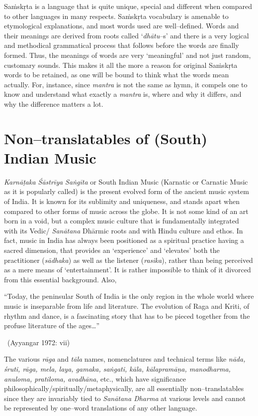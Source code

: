 Saṁskṛta is a language that is quite unique, special and different when compared to other languages in many respects. Saṁskṛta vocabulary is amenable to etymological explanations, and most words used are well–defined. Words and their meanings are derived from roots called ‘\textit{dhātu}–s’ and there is a very logical and methodical grammatical process that follows before the words are finally formed. Thus, the meanings of words are very ‘meaningful’ and not just random, customary sounds. This makes it all the more a reason for original Saṁskṛta words to be retained, as one will be bound to think what the words mean actually. For, instance, since \textit{mantra} is not the same as hymn, it compels one to know and understand what exactly a \textit{mantra} is\supskpt{\ref{999–aside.xhtmlid–c2–en3}}, where and why it differs, and why the difference matters a lot.


\section*{Non–translatables of (South) Indian Music}

\textit{Karnāṭaka Śāstrīya Saṅgīta} or South Indian Music (Karnatic or Carnatic Music as it is popularly called) is the present evolved form of the ancient music system of India. It is known for its sublimity and uniqueness, and stands apart when compared to other forms of music across the globe. It is not some kind of an art born in a void, but a complex music culture that is fundamentally integrated with its Vedic/ \textit{Sanātana} Dhārmic roots and with Hindu culture and ethos. In fact, music in India has always been positioned as a spiritual practice having a sacred dimension, that provides an ‘experience’ and ‘elevates’ both the practitioner (\textit{sādhaka}) as well as the listener (\textit{rasika}), rather than being perceived as a mere means of ‘entertainment’. It is rather impossible to think of it divorced from this essential background. Also,

\begin{myquote}
“Today, the peninsular South of India is the only region in the whole world where music is inseparable from life and literature. The evolution of Raga and Kriti, of rhythm and dance, is a fascinating story that has to be pieced together from the profuse literature of the ages…” 

~\hfill (Ayyangar 1972: vii)
\end{myquote}

The various \textit{rāga} and \textit{tāla} names, nomenclatures and technical terms like \textit{nāda, śruti, rāga, mela, laya, gamaka, saṅgati, kāla, kālapramāṇa, manodharma, anuloma, pratiloma, avadhāna}, etc., which have significance philosophically/spiritually/metaphysically, are all essentially non–translatables since they are invariably tied to \textit{Sanātana Dharma} at various levels and cannot be represented by one–word translations of any other language.

